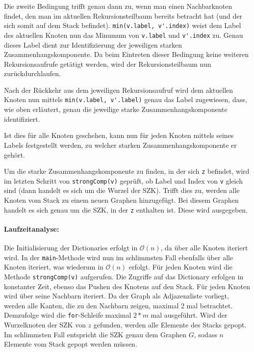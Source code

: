 \documentclass[12pt]{scrartcl}%
\theoremstyle{nonumberplain}
\newcommand{\bO}[1]{\mathcal O(#1)}
\newcommand{\code}[1]{\lstinline[basicstyle=\ttfamily\color{black}]{#1}}
\begin{document}
Die zweite Bedingung trifft genau dann zu, wenn man einen Nachbarknoten findet, den man im aktuellen Rekursionsteilbaum bereits betracht hat (und der sich somit auf dem Stack befindet). \code{min(v.label, v'.index)} weist dem Label des aktuellen Knoten nun das Minumum von \code{v.label} und \code{v'.index} zu. Genau dieses Label dient zur Identifizierung der jeweiligen starken Zusammenhangskomponente. Da beim Eintreten dieser Bedingung keine weiteren Rekursionsaufrufe getätigt werden, wird der Rekursionsteilbaum nun zurückdurchlaufen.

Nach der Rückkehr aus dem jeweiligen Rekursionsaufruf wird dem aktuellen Knoten nun mittels \code{min(v.label, v'.label)} genau das Label zugewiesen, dass, wie oben erläutert, genau die jeweilige starke Zusammenhangskomponente identifiziert. 

Ist dies für alle Knoten geschehen, kann nun für jeden Knoten mittels seines Labels festgestellt werden, zu welcher starken Zusammenhangskomponente er gehört.

Um die starke Zusammenhangskomponente zu finden, in der sich \code{z} befindet, wird im letzten Schritt von \code{strongComp(v)} geprüft, ob Label und Index von \code{v} gleich sind (dann handelt es sich um die Wurzel der SZK). Trifft dies zu, werden alle Knoten vom Stack zu einem neuen Graphen hinzugefügt. Bei diesem Graphen handelt es sich genau um die SZK, in der \code{z} enthalten ist. Diese wird ausgegeben.

\paragraph{Laufzeitanalyse:} 

Die Initialisierung der Dictionaries erfolgt in $\bO{n}$, da über alle Knoten iteriert wird. In der \code{main}-Methode wird nun im schlimmsten Fall ebenfalls über alle Knoten iteriert, was wiederum in $\bO{n}$ erfolgt. Für jeden Knoten wird die Methode \code{strongComp(v)} aufgerufen. Die Zugriffe auf das Dictionary erfolgen in konstanter Zeit, ebenso das Pushen des Knotens auf den Stack. Für jeden Knoten wird über seine Nachbarn iteriert. Da der Graph als Adjazenzliste vorliegt, werden alle Kanten, die zu den Nachbarn zeigen, maximal 2 mal betrachtet. Demzufolge wird die \code{for}-Schleife maximal $2*m$ mal ausgeführt. Wird der Wurzelknoten der SZK von $z$ gefunden, werden alle Elemente des Stacks gepopt. Im schlimmsten Fall entspricht die SZK genau dem Graphen $G$, sodass $n$ Elemente vom Stack gepopt werden müssen. 
\end{document}

